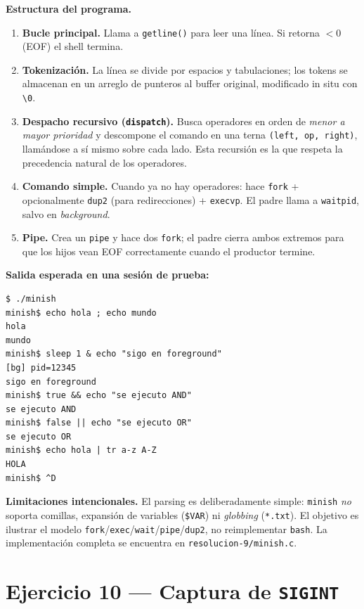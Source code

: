 \documentclass[11pt,a4paper]{article}
\begin{document}
\textbf{Estructura del programa.}
\begin{enumerate}[leftmargin=*]
    \item \textbf{Bucle principal.} Llama a \texttt{getline()} para
        leer una línea. Si retorna $<0$ (EOF) el shell termina.
    \item \textbf{Tokenización.} La línea se divide por espacios y
        tabulaciones; los tokens se almacenan en un arreglo de
        punteros al buffer original, modificado in situ con
        \texttt{\textbackslash 0}.
    \item \textbf{Despacho recursivo (\texttt{dispatch}).} Busca
        operadores en orden de \emph{menor a mayor prioridad} y
        descompone el comando en una terna \texttt{(left, op, right)},
        llamándose a sí mismo sobre cada lado. Esta recursión es la
        que respeta la precedencia natural de los operadores.
    \item \textbf{Comando simple.} Cuando ya no hay operadores: hace
        \texttt{fork} + opcionalmente \texttt{dup2} (para
        redirecciones) + \texttt{execvp}. El padre llama a
        \texttt{waitpid}, salvo en \emph{background}.
    \item \textbf{Pipe.} Crea un \texttt{pipe} y hace dos \texttt{fork};
        el padre cierra ambos extremos para que los hijos vean EOF
        correctamente cuando el productor termine.
\end{enumerate}

\textbf{Salida esperada en una sesión de prueba:}

\begin{lstlisting}[style=outstyle]
$ ./minish
minish$ echo hola ; echo mundo
hola
mundo
minish$ sleep 1 & echo "sigo en foreground"
[bg] pid=12345
sigo en foreground
minish$ true && echo "se ejecuto AND"
se ejecuto AND
minish$ false || echo "se ejecuto OR"
se ejecuto OR
minish$ echo hola | tr a-z A-Z
HOLA
minish$ ^D
\end{lstlisting}

\textbf{Limitaciones intencionales.} El parsing es deliberadamente
simple: \texttt{minish} \emph{no} soporta comillas, expansión de
variables (\texttt{\$VAR}) ni \emph{globbing} (\texttt{*.txt}). El
objetivo es ilustrar el modelo
\texttt{fork}/\texttt{exec}/\texttt{wait}/\texttt{pipe}/\texttt{dup2},
no reimplementar \texttt{bash}. La implementación completa se
encuentra en \texttt{resolucion-9/minish.c}.

\section{Ejercicio 10 --- Captura de \texttt{SIGINT}}
\end{document}
